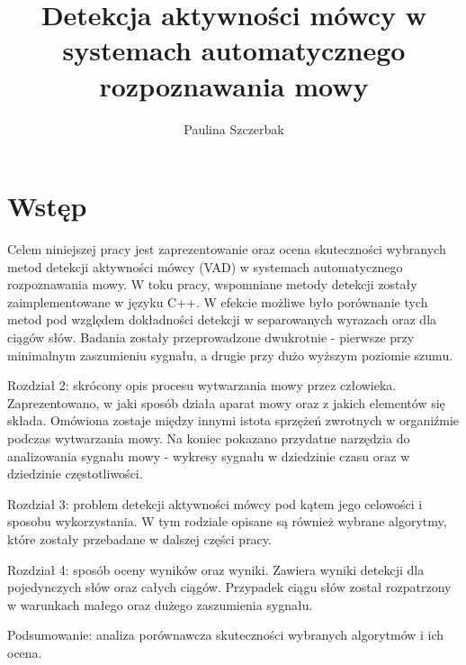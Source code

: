 \documentclass[eng,printmode]{mgr}
\title{Detekcja aktywności mówcy w systemach automatycznego rozpoznawania mowy}
\author{Paulina Szczerbak}
\begin{document}

\maketitle %

\tableofcontents %

\chapter{Wstęp}
Celem niniejszej pracy jest zaprezentowanie oraz ocena skuteczności wybranych metod detekcji aktywności mówcy (VAD) w systemach automatycznego rozpoznawania mowy. W toku pracy, wspomniane metody detekcji zostały zaimplementowane w języku C++. W efekcie możliwe było porównanie tych metod pod względem dokładności detekcji w separowanych wyrazach oraz dla ciągów słów. Badania zostały przeprowadzone dwukrotnie - pierwsze przy minimalnym zaszumieniu sygnału, a drugie przy dużo wyższym poziomie szumu. \vspace{3mm}

Rozdział 2: skrócony opis procesu wytwarzania mowy przez człowieka. Zaprezentowano, w jaki sposób działa aparat mowy oraz z jakich elementów się składa. Omówiona zostaje między innymi istota sprzężeń zwrotnych w organiźmie podczas wytwarzania mowy. Na koniec pokazano przydatne narzędzia do analizowania sygnału mowy - wykresy sygnału w dziedzinie czasu oraz w dziedzinie częstotliwości.\vspace{3mm}

Rozdział 3: problem detekcji aktywności mówcy pod kątem jego celowości i sposobu wykorzystania. W tym rodziale opisane są również wybrane algorytmy, które zostały przebadane w dalszej części pracy. \vspace{3mm}

Rozdział 4: sposób oceny wyników oraz wyniki. Zawiera  wyniki detekcji dla pojedynczych słów oraz całych ciągów. Przypadek ciągu słów został rozpatrzony w warunkach małego oraz dużego zaszumienia sygnału. \vspace{3mm}

Podsumowanie: analiza porównawcza skuteczności wybranych algorytmów i ich ocena.
\end{document}
